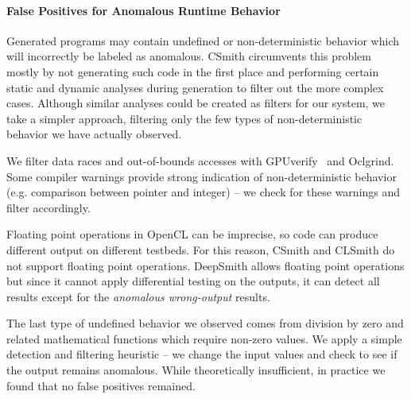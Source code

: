 \paragraph{False Positives for Anomalous Runtime Behavior}\label{subsec:discussions}
Generated programs may contain undefined or non-deterministic behavior which will incorrectly be labeled as anomalous. CSmith circumvents this problem mostly by not generating such code in the first place and performing certain static and dynamic analyses during generation to filter out the more complex cases. Although similar analyses could be created as filters for our system, we take a simpler approach, filtering only the few types of non-deterministic behavior we have actually observed. 

We filter data races and out-of-bounds accesses with GPUverify~\cite{Betts2012} and Oclgrind. Some compiler warnings provide strong indication of non-deterministic behavior (e.g. comparison between pointer and integer) -- we check for these warnings and filter accordingly.

  
Floating point operations in OpenCL can be imprecise, so code can produce different output on different testbeds. For this reason, CSmith and CLSmith do not support floating point operations. DeepSmith allows floating point operations but since it cannot apply differential testing on the outputs, it can detect all results except for the \emph{anomalous wrong-output} results.

The last type of undefined behavior we observed comes from division by zero and related mathematical functions which require non-zero values. We apply a simple detection and filtering heuristic -- we change the input values and check to see if the output remains anomalous. While theoretically insufficient, in practice we found that no false positives remained.


